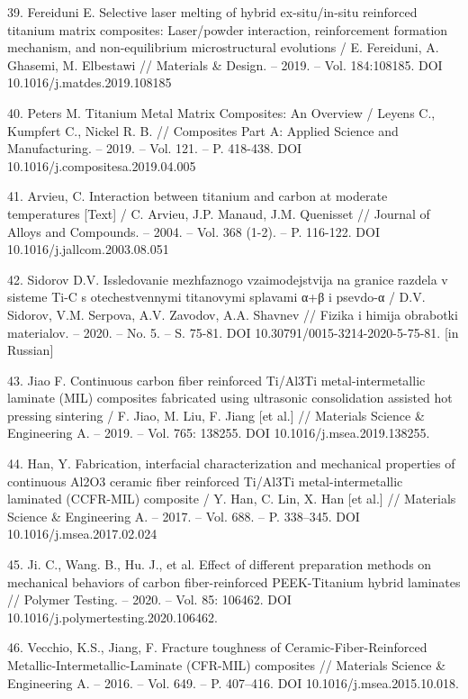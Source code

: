 \begin{references}
39. Fereiduni E. Selective laser melting of hybrid ex-situ/in-situ
reinforced titanium matrix composites: Laser/powder interaction,
reinforcement formation mechanism, and non-equilibrium microstructural
evol\-utions / E. Fereiduni, A. Ghasemi, M. Elbestawi // Materials \&
Design. -- 2019. -- Vol. 184:108185. DOI 10.1016/j.matdes.2019.108185

40. Peters M. Titanium Metal Matrix Composites: An Overview / Leyens C.,
Kumpfert C., Nickel R. B. // Composites Part A: Applied Science and
Manufacturing. -- 2019. -- Vol. 121. -- P. 418-438. DOI
10.1016/j.compositesa.2019.04.005

41. Arvieu, C. Interaction between titanium and carbon at moderate
temperatures {[}Text{]} / C. Arvieu, J.P. Manaud, J.M. Quenisset //
Journal of Alloys and Compounds. -- 2004. -- Vol. 368 (1-2). -- P.
116-122. DOI 10.1016/j.jallcom.2003.08.051

42. Sidorov D.V. Issledovanie mezhfaznogo vzaimodejstvija na granice
razdela v sisteme Ti-C s otechestv\-ennymi titanovymi splavami α+β i
psevdo-α / D.V. Sidorov, V.M. Serpova, A.V. Zavodov, A.A. Shavnev //
Fizika i himija obrabotki materialov. -- 2020. -- No. 5. -- S. 75-81.
DOI 10.30791/0015-3214-2020-5-75-81. {[}in Russian{]}

43. Jiao F. Continuous carbon fiber reinforced Ti/Al3Ti
metal-intermetallic laminate (MIL) composites fabricated using
ultrasonic consolidation assisted hot pressing sintering / F. Jiao, M.
Liu, F. Jiang {[}et al.{]} // Materials Science \& Engineering A. --
2019. -- Vol. 765: 138255. DOI 10.1016/j.msea.2019.138255.

44. Han, Y. Fabrication, interfacial characterization and mechanical
properties of continuous Al2O3 cera\-mic fiber reinforced Ti/Al3Ti
metal-intermetallic laminated (CCFR-MIL) composite / Y. Han, C. Lin, X.
Han {[}et al.{]} // Materials Science \& Engineering A. -- 2017. -- Vol.
688. -- P. 338--345. DOI \\10.1016/j.msea.2017.02.024

45. Ji. C., Wang. B., Hu. J., et al. Effect of different preparation
methods on mechanical behaviors of carbon fiber-reinforced PEEK-Titanium
hybrid laminates // Polymer Testing. -- 2020. -- Vol. 85: 106462. DOI
10.1016/j.polymertesting.2020.106462.

46. Vecchio, K.S., Jiang, F. Fracture toughness of
Ceramic-Fiber-Reinforced Metallic-Intermetallic-Lami\-nate (CFR-MIL)
composites // Materials Science \& Engineering A. -- 2016. -- Vol. 649.
-- P. 407--416. DOI 10.1016/j.msea.2015.10.018.


\end{references}
